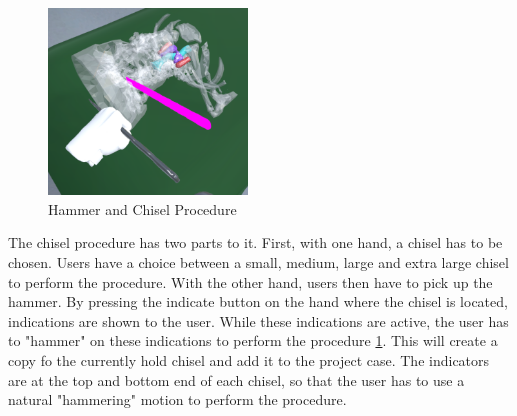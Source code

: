 \begin{figure}[ht]
    \centering
    \includegraphics[width=200px]{images/implementation/features/procedures/chisel.png}
    \caption{\label{fig::FeatureChisel}Hammer and Chisel Procedure}
\end{figure}

The chisel procedure has two parts to it.
First, with one hand, a chisel has to be chosen.
Users have a choice between a small, medium, large and extra large chisel to perform the procedure.
With the other hand, users then have to pick up the hammer.
By pressing the indicate button on the hand where the chisel is located, indications are shown to the user.
While these indications are active, the user has to "hammer" on these indications to perform the procedure \ref{fig::FeatureChisel}.
This will create a copy fo the currently hold chisel and add it to the project case.
The indicators are at the top and bottom end of each chisel, so that the user has to use a natural "hammering" motion to perform the procedure.